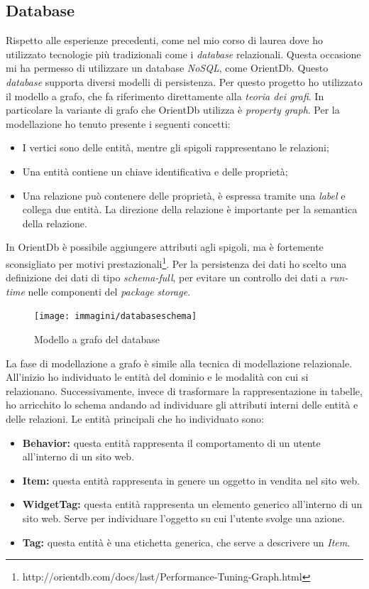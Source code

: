 \subsection{Database}
Rispetto alle esperienze precedenti, come nel mio corso di laurea dove ho utilizzato tecnologie più tradizionali come i \emph{database} relazionali. Questa occasione mi ha permesso di utilizzare un database \emph{NoSQL}, come OrientDb. Questo \emph{database} supporta diversi modelli di persistenza. Per questo progetto ho utilizzato il modello a grafo, che fa riferimento direttamente alla \emph{teoria dei grafi}. In particolare la variante di grafo che OrientDb utilizza è \emph{property graph}. Per la modellazione ho tenuto presente i seguenti concetti:
\begin{itemize}
\item I vertici sono delle entità, mentre gli spigoli rappresentano le relazioni;
\item Una entità contiene un chiave identificativa e delle proprietà; 
\item Una relazione può contenere delle proprietà, è espressa tramite una \emph{label} e collega due entità. La direzione della relazione è importante per la semantica della relazione.
\end{itemize}
In OrientDb è possibile aggiungere attributi agli spigoli, ma è fortemente sconsigliato per motivi prestazionali\footnote{http://orientdb.com/docs/last/Performance-Tuning-Graph.html}. Per la persistenza dei dati ho scelto una definizione dei dati di tipo \emph{schema-full}, per evitare un controllo dei dati a \emph{run-time} nelle componenti del \emph{package} \emph{storage}.
\newpage
\begin{figure}[h]
\centering
\texttt{[image: immagini/databaseschema]}
\caption{Modello a grafo del database}
\label{fig:database-schema}
\end{figure}
La fase di modellazione a grafo è simile alla tecnica di modellazione relazionale. All'inizio ho individuato le entità del dominio e le modalità con cui si relazionano. Successivamente, invece di trasformare la rappresentazione in tabelle, ho arricchito lo schema andando ad individuare gli attributi interni delle entità e delle relazioni. Le entità principali che ho individuato sono:
\begin{itemize}
\item \textbf{Behavior:} questa entità rappresenta il comportamento di un utente all'interno di un sito web.
\item \textbf{Item:} questa entità rappresenta in genere un oggetto in vendita nel sito web.
\item \textbf{WidgetTag:} questa entità rappresenta un elemento generico all'interno di un sito web. Serve per individuare l'oggetto su cui l'utente svolge una azione.
\item \textbf{Tag:} questa entità è una etichetta generica, che serve a descrivere un \emph{Item}.
\end{itemize}
